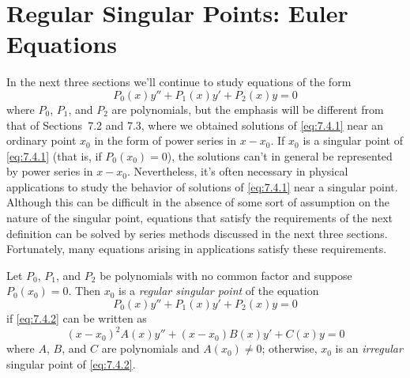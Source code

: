 \section{Regular Singular Points: Euler Equations}

\noindent
{}

\noindent
In the next three sections we'll continue to study equations of the form
\begin{equation}
  \label{eq:7.4.1}P_{0}(x)y''+P_{1}(x)y'+P_{2}(x)y=0
\end{equation}
where $P_{0}$, $P_{1}$, and $P_{2}$ are polynomials, but the emphasis will be different from that of
Sections~7.2 and 7.3, where we obtained solutions of \eqref{eq:7.4.1} near an ordinary point $x_{0}$
in the form of power series in $x-x_{0}$. If $x_{0}$ is a singular point of \eqref{eq:7.4.1} (that
is, if $P_{0}(x_{0})=0$), the solutions can't in general be represented by power series in $x-x_{0}$.
Nevertheless, it's often necessary in physical applications to study the behavior of solutions of
\eqref{eq:7.4.1} near a singular point. Although this can be difficult in the absence of some sort
of assumption on the nature of the singular point, equations that satisfy the requirements of the
next definition can be solved by series methods discussed in the next three sections. Fortunately,
many equations arising in applications satisfy these requirements.

\begin{definition}
  \color{blue}
  \label{thmtype:7.4.1}\rm Let $P_{0}$, $P_{1}$, and $P_{2}$ be polynomials with no common factor
  and suppose $P_{0}(x_{0})=0$. Then $x_{0}$ is a {\color{blue}\it regular singular point\/} of the
  equation
  \begin{equation}
    \label{eq:7.4.2}P_{0}(x)y''+P_{1}(x)y'+P_{2}(x)y=0
  \end{equation}
  if \eqref{eq:7.4.2} can be written as
  \begin{equation}
    \label{eq:7.4.3}(x-x_{0})^{2}A(x)y''+(x-x_{0})B(x)y'+C(x)y=0
  \end{equation}
  where $A$, $B$, and $C$ are polynomials and $A(x_{0})\ne0$; otherwise, $x_{0}$ is an
  {\color{blue}\it irregular\/} singular point of \eqref{eq:7.4.2}.
\end{definition}

